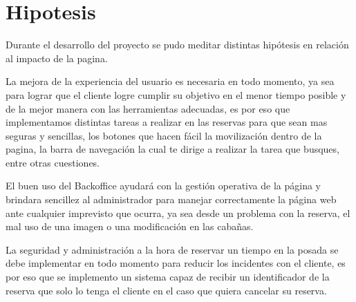 \section{Hipotesis}

Durante el desarrollo del proyecto se pudo meditar distintas hipótesis en relación al impacto de la pagina.

La mejora de la experiencia del usuario es necesaria en todo momento, ya sea para lograr que el cliente logre cumplir su objetivo en el menor tiempo posible y de la mejor manera con las herramientas adecuadas, es por eso que implementamos distintas tareas a realizar en las reservas para que sean mas seguras y sencillas, los botones que hacen fácil la movilización dentro de la pagina, la barra de navegación la cual te dirige a realizar la tarea que busques, entre otras cuestiones.

El buen uso del Backoffice ayudará con la gestión operativa de la página y brindara sencillez al administrador para manejar correctamente la página web ante cualquier imprevisto que ocurra, ya sea desde un problema con la reserva, el mal uso de una imagen o una modificación en las cabañas.

La seguridad y administración a la hora de reservar un tiempo en la posada se debe implementar en todo momento para reducir los incidentes con el cliente, es por eso que se implemento un sistema capaz de recibir un identificador de la reserva que solo lo tenga el cliente en el caso que quiera cancelar su reserva.

